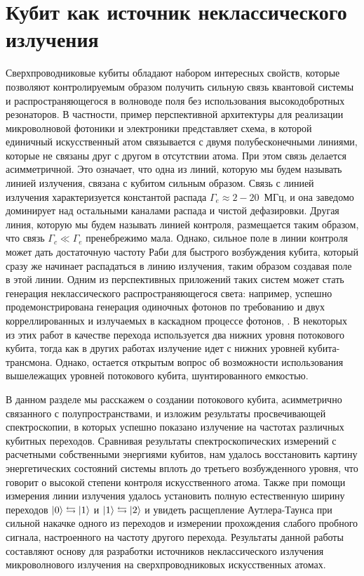 \chapter{Кубит как источник неклассического излучения}
Сверхпроводниковые кубиты обладают набором интересных свойств, которые позволяют контролируемым образом получить сильную связь квантовой системы и распространяющегося в волноводе поля без использования высокодобротных резонаторов. В частности, пример перспективной архитектуры для реализации микроволновой фотоники и электроники представляет схема, в которой единичный искусственный атом связывается с двумя полубесконечными линиями, которые не связаны друг с другом в отсутствии атома. При этом связь делается асимметричной. Это означает, что одна из линий, которую мы будем называть линией излучения, связана с кубитом сильным образом. Связь с линией излучения характеризуется константой распада $\Gamma_e\approx 2-20$~МГц, и она заведомо доминирует над остальными каналами распада и чистой дефазировки. Другая линия, которую мы будем называть линией контроля, размещается таким образом, что связь $\Gamma_c\ll\Gamma_e$ пренебрежимо мала. Однако, сильное поле в линии контроля может дать достаточную частоту Раби для быстрого возбуждения кубита, который сразу же начинает распадаться в линию излучения, таким образом создавая поле в этой линии. Одним из перспективных приложений таких систем может стать генерация неклассического распространяющегося света: например, успешно продемонстрирована генерация одиночных фотонов по требованию \cite{peng2016tuneable,Shaped_SPS,PechalShaped} и двух корреллированных и излучаемых в каскадном процессе фотонов, \cite{Wallraff_entangledPhotons}. В некоторых из этих работ в качестве перехода используется два нижних уровня потокового кубита, тогда как в других работах излучение идет с нижних уровней кубита-трансмона. Однако, остается открытым вопрос об возможности использования вышележащих уровней потокового кубита, шунтированного емкостью. 

В данном разделе мы расскажем о создании потокового кубита, асимметрично связанного с полупространствами, и изложим результаты просвечивающей спектроскопии, в которых успешно показано излучение на частотах различных кубитных переходов. Сравнивая результаты спектроскопических измерений с расчетными собственными энергиями кубитов, нам удалось восстановить картину энергетических состояний системы вплоть до третьего возбужденного уровня, что говорит о высокой степени контроля искусственного атома. Также при помощи измерения линии излучения удалось установить полную естественную ширину переходов $\ket{0}\leftrightarrows\ket{1}$ и $\ket{1}\leftrightarrows\ket{2}$ и увидеть расщепление Аутлера-Таунса при сильной накачке одного из переходов и измерении прохождения слабого пробного сигнала, настроенного на частоту другого перехода. Результаты данной работы составляют основу для разработки источников неклассического излучения микроволнового излучения на сверхпроводниковых искусственных атомах.
